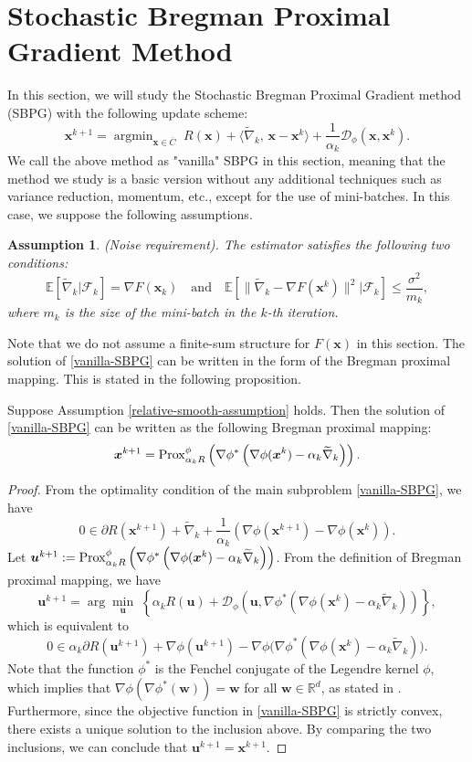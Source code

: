 \documentclass[twoside,11pt]{article}
\newcommand{\R}{\mathbb R}
\newcommand{\E}{\mathbb{E}}
\newcommand{\cD}{\mathcal D}
\newcommand{\cF}{\mathcal F}
\newcommand{\wtnabla}{\widetilde\nabla}
\DeclareMathOperator*{\argmin}{argmin}
\def\inprod#1#2{\langle#1,\,#2\rangle}
\newtheorem{assumption}{Assumption}%
\def\vu{{\bm{u}}}
\def\vw{{\bm{w}}}
\def\vx{{\bm{x}}}
\begin{document}
\section{Stochastic Bregman Proximal Gradient Method}\label{section-vanilla-SBPG}
In this section, we will study the Stochastic Bregman Proximal Gradient method (SBPG) with the following update scheme:
\begin{equation}
{\vx^{k+1}}=\argmin_{\vx\in\overline{C}}\;R(\vx)+\inprod{\widetilde\nabla_k}{\vx-{\vx^k}}+\frac{1}{\alpha_k}\cD_\phi(\vx,{\vx^k}).
\label{vanilla-SBPG}
\tag{SBPG}
\end{equation}
We call {the above method as} "vanilla" SBPG in this section, meaning that the method we study is a basic version without any additional techniques such as variance reduction, momentum, etc., except for the use of mini-batches. In this case, we suppose the following assumptions.
\begin{assumption}\label{variance-assumption}
(Noise requirement).
The estimator satisfies the following two conditions:
$$\E[\widetilde{\nabla}_k|\cF_k]=\nabla F({\vx_k}) \quad \text{and}\quad 
\mathbb E[\|\widetilde\nabla_k-\nabla F({\vx^k})\|^2|\cF_k]\leq\frac{\sigma^2}{m_k},$$ where $m_k$ is the size of the mini-batch in the $k$-th iteration.    
\end{assumption}
 {Note} that we do not assume a finite-sum structure for $F(\vx)$ in this section. The solution of \eqref{vanilla-SBPG} can be written in the form of the Bregman proximal mapping. This is stated in the following proposition. 
 \begin{proposition} 
  \label{subprob-closed-form-sol} 
 Suppose Assumption \ref{relative-smooth-assumption} holds. Then the solution of \eqref{vanilla-SBPG} can be written as the following Bregman proximal mapping:
 \[
 {\vx^{k+1}}={\rm Prox}^\phi_{\alpha_k R}\left(\nabla\phi^*\left(\nabla\phi({\vx^k})-\alpha_k\widetilde\nabla_k\right)\right).
 \]
 \end{proposition}
 \begin{proof}
From the optimality condition of the main subproblem \eqref{vanilla-SBPG}, we have
 \[
 0\in\partial R({\vx^{k+1}})+\wtnabla_k+\frac{1}{\alpha_k}\left(\nabla\phi({\vx^{k+1}})-\nabla\phi({\vx^k})\right).
 \]
Let $\vu^{k+1}:={\rm Prox}^\phi_{\alpha_k R}\left(\nabla\phi^*\left(\nabla\phi({\vx^k})-\alpha_k\widetilde\nabla_k\right)\right)$. From the definition of Bregman proximal mapping, we have
\[
\vu^{k+1}=\arg\min_\vu\;\left\{\alpha_kR(\vu)+{\cD_\phi}\left(\vu,\nabla\phi^*\left(\nabla\phi({\vx^k})-\alpha_k\widetilde\nabla_k\right)\right)\right\},
\]
which is equivalent to
\[
0\in\alpha_k\partial R(\vu^{k+1})+\nabla\phi(\vu^{k+1})-\nabla\phi\big(\nabla\phi^*(\nabla\phi({\vx^k})-\alpha_k\wtnabla_k)\big).
\]
Note that the function $\phi^*$ is the Fenchel conjugate of the Legendre kernel $\phi$, which implies that $\nabla\phi(\nabla\phi^*(\vw))=\vw$ for all $\vw\in\R^d$, as stated in \cite[Corollary 13.3.1, Theorem 26.5]{rockafellar1997convex}. Furthermore, since the objective function in \eqref{vanilla-SBPG} is strictly convex, there exists a unique solution to the inclusion above. By comparing the two inclusions, we can conclude that $\vu^{k+1}={\vx^{k+1}}$.
 \end{proof}
\end{document}
